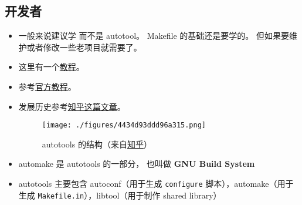 \subsection{开发者}
\begin{itemize}
\item 一般来说建议学  而不是 autotool。 Makefile 的基础还是要学的。 但如果要维护或者修改一些老项目就需要了。
\item 这里有一个\href{https://devmanual.gentoo.org/general-concepts/autotools/index.html}{教程}。
\item 参考\href{https://www.gnu.org/software/automake/manual/html_node/Autotools-Introduction.html}{官方教程}。
\item 发展历史参考\href{https://www.zhihu.com/question/22644913/answer/141475420}{知乎这篇文章}。
\begin{figure}[ht]
\centering
\texttt{[image: ./figures/4434d93ddd96a315.png]}
\caption{autotools 的结构（来自\href{https://www.zhihu.com/question/22644913/answer/141475420}{知乎}）} \label{fig_automk_1}
\end{figure}
\item automake 是 autotools 的一部分， 也叫做 \textbf{GNU Build System}
\item autotools 主要包含 autoconf（用于生成 \verb`configure` 脚本），automake（用于生成 \verb`Makefile.in`），libtool（用于制作 shared library）
\end{itemize}

